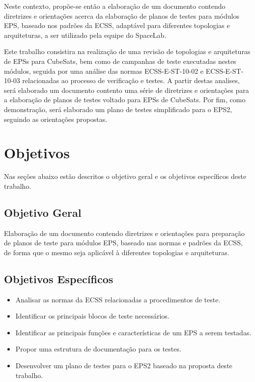 Neste contexto, propõe-se então a elaboração de um documento contendo diretrizes e orientações acerca da elaboração de planos de testes para módulos \gls{EPS}, baseado nos padrões da \gls{ECSS}, adaptável para diferentes topologias e arquiteturas, a ser utilizado pela equipe do SpaceLab.

Este trabalho consistira na realização de uma revisão de topologias e arquiteturas de EPSs para CubeSats, bem como de campanhas de teste executadas nestes módulos, seguida por uma análise das normas ECSS-E-ST-10-02 \cite{ecss-e-st-10-02} e ECSS-E-ST-10-03 \cite{ecss-e-st-10-03} relacionadas ao processo de verificação e testes. A partir destas analises, será elaborado um documento contento uma série de diretrizes e orientações para a elaboração de planos de testes voltado para EPSs de CubeSats. Por fim, como demonstração, será elaborado um plano de testes simplificado para o \gls{EPS2}, seguindo as orientações propostas.

\section{Objetivos}\label{sec:objetivos}

Nas seções abaixo estão descritos o objetivo geral e os objetivos específicos deste trabalho.

\subsection{Objetivo Geral}


Elaboração de um documento contendo diretrizes e orientações para preparação de planos de teste para módulos \gls{EPS}, baseado nas normas e padrões da \gls{ECSS}, de forma que o mesmo seja aplicável à diferentes topologias e arquiteturas.

\subsection{Objetivos Específicos}

\begin{itemize}
    \item Analisar as normas da ECSS relacionadas a procedimentos de teste.
    \item Identificar os principais blocos de teste necessários.
    \item Identificar as principais funções e características de um \gls{EPS} a serem testadas.
    \item Propor uma estrutura de documentação para os testes.
    \item Desenvolver um plano de testes para o \gls{EPS2} baseado na proposta deste trabalho.
\end{itemize}